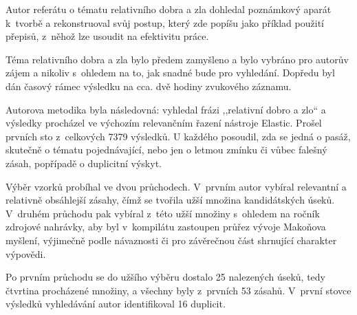 Autor referátu o tématu relativního dobra a zla dohledal poznámkový aparát
k~tvorbě a rekonstruoval svůj postup, který zde popíšu jako příklad použití
přepisů, z~něhož lze usoudit na efektivitu práce.

Téma relativního dobra a zla bylo předem zamyšleno a bylo vybráno pro autorův
zájem a nikoliv s~ohledem na to, jak snadné bude pro vyhledání. Dopředu byl dán
časový rámec výsledku na cca. dvě hodiny zvukového záznamu.

Autorova metodika byla následovná: vyhledal frázi ,,relativní dobro a zlo`` a
výsledky procházel ve výchozím relevančním řazení nástroje Elastic. Prošel
prvních sto z~celkových 7379 výsledků. U každého posoudil, zda se jedná o
pasáž, skutečně o tématu pojednávající, nebo jen o letmou zmínku či vůbec
falešný zásah, popřípadě o duplicitní výskyt.

Výběr vzorků probíhal ve dvou průchodech. V~prvním autor vybíral relevantní a
relativně obsáhlejší zásahy, čímž se tvořila užší množina kandidátských úseků.
V~druhém průchodu pak vybíral z~této užší množiny s~ohledem na ročník zdrojové
nahrávky, aby byl v~kompilátu zastoupen průřez vývoje Makoňova myšlení,
výjimečně podle návaznosti či pro závěrečnou část shrnující charakter výpovědi.

Po prvním průchodu se do užšího výběru dostalo 25 nalezených úseků, tedy
čtvrtina procházené množiny, a všechny byly z~prvních 53 zásahů. V~první stovce
výsledků vyhledávání autor identifikoval 16 duplicit.
